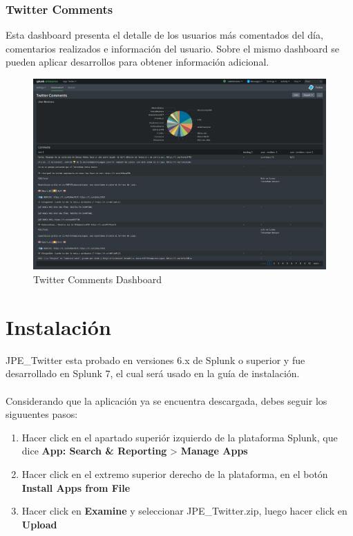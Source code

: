 \documentclass[report]{article}
\begin{document}
\newpage

\subsubsection{Twitter Comments}

Esta dashboard presenta el detalle de los usuarios m\'as comentados del d\'ia, comentarios realizados e informaci\'on del usuario. Sobre el mismo dashboard se pueden aplicar desarrollos para obtener informaci\'on adicional.
\newline
\begin{figure}[h!]
	\centering
	\includegraphics[scale=0.2]{img/comments.png}
	\caption{\color{text}Twitter Comments Dashboard}
\end{figure}

\newpage

\section{Instalaci\'on}

JPE\_Twitter esta probado en versiones 6.x de Splunk o superior y fue desarrollado en Splunk 7, el cual ser\'a usado en la gu\'ia de instalaci\'on.\\
\\
Considerando que la aplicaci\'on ya se encuentra descargada, debes seguir los siguuentes pasos:
\newline
\begin{enumerate}[label=(\alph*)]
\item Hacer click en el apartado superi\'or izquierdo de la plataforma Splunk, que dice \textbf{App: Search \& Reporting} > \textbf{Manage Apps}
\item Hacer click en el extremo superior derecho de la plataforma, en el bot\'on \textbf{Install Apps from File}
\item Hacer click en \textbf{Examine} y seleccionar JPE\_Twitter.zip, luego hacer click en \textbf{Upload}
\newline
\end{enumerate}
\end{document}

